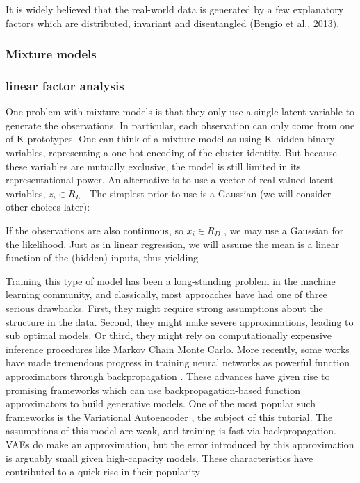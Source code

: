 It is widely believed that the real-world data is generated by a few explanatory factors which are distributed, invariant and disentangled (Bengio et al., 2013).



\subsubsection{Mixture models}



\subsubsection{linear factor analysis}

One problem with mixture models is that they only use a single latent variable to generate the
observations. In particular, each observation can only come from one of K prototypes. One can
think of a mixture model as using K hidden binary variables, representing a one-hot encoding
of the cluster identity. But because these variables are mutually exclusive, the model is still
limited in its representational power.
An alternative is to use a vector of real-valued latent variables, $z_i \in R_L$ . The simplest prior
to use is a Gaussian (we will consider other choices later):


If the observations are also continuous, so $x_i \in R_D$ , we may use a Gaussian for the likelihood.
Just as in linear regression, we will assume the mean is a linear function of the (hidden) inputs,
thus yielding




Training this type of model has been a long-standing problem in the machine learning community, and classically, most approaches have had one of three serious drawbacks. First, they might require strong assumptions about the structure in the data. Second, they might make severe approximations, leading to sub optimal models. Or third, they might rely on computationally expensive inference procedures like Markov Chain Monte Carlo. More recently, some works have made tremendous progress in training neural networks as powerful function approximators through backpropagation \cite{NIPS2012_4824}. These advances have given rise to promising frameworks which can use backpropagation-based function approximators to build generative models. One of the most popular such frameworks is the Variational Autoencoder \cite{}, the subject of this tutorial. The assumptions of this model are weak, and training is fast via backpropagation. VAEs do make an approximation, but the error introduced by this approximation is arguably small given high-capacity models. These characteristics have contributed to a quick rise in their popularity

